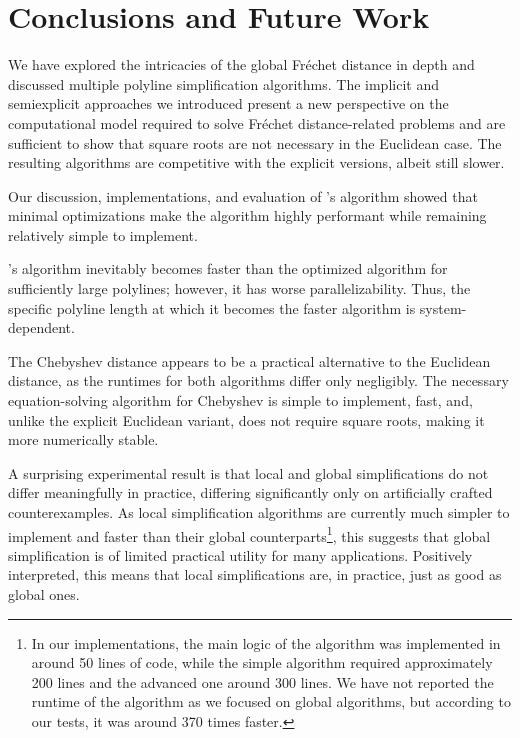 \section{Conclusions and Future Work}
\label{sec:discussion_conclusion}

We have explored the intricacies of the global Fréchet distance in depth and discussed multiple polyline simplification algorithms.
The implicit and semiexplicit approaches we introduced present a new perspective on the computational model required to solve Fréchet distance-related problems and are sufficient to show that square roots are not necessary in the Euclidean case. The resulting algorithms are competitive with the explicit versions, albeit still slower.

Our discussion, implementations, and evaluation of \citeauthor{on_optimal_polyline_simplification_using_the_hausdorff_and_frechet_distance}'s algorithm showed that minimal optimizations make the algorithm highly performant while remaining relatively simple to implement.

\citeauthor{polyline_simplification_has_cubic_complexity_bringmannetal}'s algorithm inevitably becomes faster than the optimized \citeauthor{on_optimal_polyline_simplification_using_the_hausdorff_and_frechet_distance} algorithm for sufficiently large polylines; however, it has worse parallelizability. Thus, the specific polyline length at which it becomes the faster algorithm is system-dependent.

The Chebyshev distance appears to be a practical alternative to the Euclidean distance, as the runtimes for both algorithms differ only negligibly. The necessary equation-solving algorithm for Chebyshev is simple to implement, fast, and, unlike the explicit Euclidean variant, does not require square roots, making it more numerically stable.

A surprising experimental result is that local and global simplifications do not differ meaningfully in practice, differing significantly only on artificially crafted counterexamples. As local simplification algorithms are currently much simpler to implement and faster than their global counterparts\footnote{In our implementations, the main logic of the \citeauthor{computational_geometric_methods_for_polygonal_approximations_of_a_curve} algorithm was implemented in around 50 lines of code, while the simple algorithm required approximately 200 lines and the advanced one around 300 lines. We have not reported the runtime of the \citeauthor{computational_geometric_methods_for_polygonal_approximations_of_a_curve} algorithm as we focused on global algorithms, but according to our tests, it was around 370 times faster.}, this suggests that global simplification is of limited practical utility for many applications. Positively interpreted, this means that local simplifications are, in practice, just as good as global ones.

